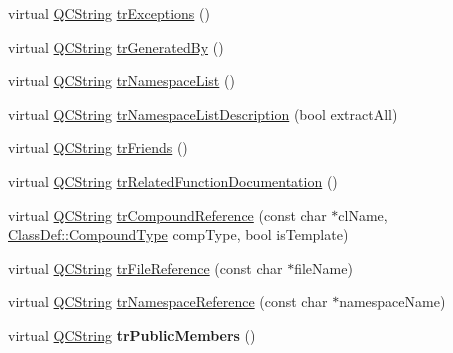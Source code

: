 \begin{DoxyCompactItemize}
\item 
virtual \mbox{\hyperlink{class_q_c_string}{Q\+C\+String}} \mbox{\hyperlink{class_translator_chinesetraditional_ad24c0dcf0138acddae4d8ecf43f4717d}{tr\+Exceptions}} ()
\item 
virtual \mbox{\hyperlink{class_q_c_string}{Q\+C\+String}} \mbox{\hyperlink{class_translator_chinesetraditional_aeb5bb752c5fd1b1338aa6da084c65caa}{tr\+Generated\+By}} ()
\item 
virtual \mbox{\hyperlink{class_q_c_string}{Q\+C\+String}} \mbox{\hyperlink{class_translator_chinesetraditional_a6035de5fac1c09cffbad24fbb359791c}{tr\+Namespace\+List}} ()
\item 
virtual \mbox{\hyperlink{class_q_c_string}{Q\+C\+String}} \mbox{\hyperlink{class_translator_chinesetraditional_a5b8b57ddcb0596a4a01b750ee003fdab}{tr\+Namespace\+List\+Description}} (bool extract\+All)
\item 
virtual \mbox{\hyperlink{class_q_c_string}{Q\+C\+String}} \mbox{\hyperlink{class_translator_chinesetraditional_a3b2466a051e3ce2d5a61c97fd219e6da}{tr\+Friends}} ()
\item 
virtual \mbox{\hyperlink{class_q_c_string}{Q\+C\+String}} \mbox{\hyperlink{class_translator_chinesetraditional_a81f57cd0b4950a7dee0c05399f68a851}{tr\+Related\+Function\+Documentation}} ()
\item 
virtual \mbox{\hyperlink{class_q_c_string}{Q\+C\+String}} \mbox{\hyperlink{class_translator_chinesetraditional_abc223ad4429cb08482f3b5a259b59f95}{tr\+Compound\+Reference}} (const char $\ast$cl\+Name, \mbox{\hyperlink{class_class_def_ae70cf86d35fe954a94c566fbcfc87939}{Class\+Def\+::\+Compound\+Type}} comp\+Type, bool is\+Template)
\item 
virtual \mbox{\hyperlink{class_q_c_string}{Q\+C\+String}} \mbox{\hyperlink{class_translator_chinesetraditional_a4346906c175fb402dcf1e41e7f920b22}{tr\+File\+Reference}} (const char $\ast$file\+Name)
\item 
virtual \mbox{\hyperlink{class_q_c_string}{Q\+C\+String}} \mbox{\hyperlink{class_translator_chinesetraditional_ad795887762606aeb8f2103205c4dbee7}{tr\+Namespace\+Reference}} (const char $\ast$namespace\+Name)
\item 
\mbox{\label{class_translator_chinesetraditional_a62541b62178c26cd4ec03c321749d432}} 
virtual \mbox{\hyperlink{class_q_c_string}{Q\+C\+String}} {\bfseries tr\+Public\+Members} ()
\item 
\mbox{\label{class_translator_chinesetraditional_acb9d7439fe778168a28ceb5fc8804657}} 

\end{DoxyCompactItemize}
